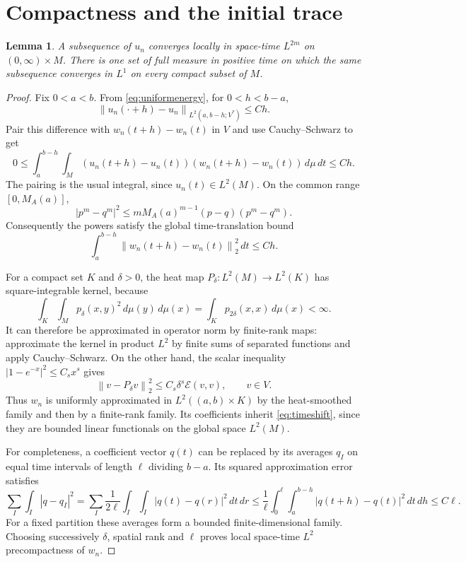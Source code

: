 \documentclass[11pt]{article}
\newtheorem{lemma}[theorem]{Lemma}
\theoremstyle{remark}
\newcommand{\dd}{\,d\mu}
\newcommand{\E}{\mathcal E}
\newcommand{\norm}[1]{\left\lVert#1\right\rVert}
\begin{document}
\section{Compactness and the initial trace}

\begin{lemma}\label{lem:compactness}
A subsequence of $u_n$ converges locally in space-time $L^{2m}$ on
$(0,\infty)\times M$. There is one set of full measure in positive time
on which the same subsequence converges in $L^1$ on every compact subset
of $M$.
\end{lemma}

\begin{proof}
Fix $0<a<b$. From \eqref{eq:uniformenergy}, for $0<h<b-a$,
\[
 \norm{u_n(\cdot+h)-u_n}_{L^2(a,b-h;V^*)}\le Ch.
\]
Pair this difference with $w_n(t+h)-w_n(t)$ in $V$ and use
Cauchy--Schwarz to get
\begin{equation}\label{eq:pairedshift}
 0\le \int_a^{b-h}\!\int_M
 (u_n(t+h)-u_n(t))(w_n(t+h)-w_n(t))\dd\,dt\le Ch.
\end{equation}
The pairing is the usual integral, since $u_n(t)\in L^2(M)$.
On the common range $[0,M_A(a)]$,
\[
 |p^m-q^m|^2\le mM_A(a)^{m-1}(p-q)(p^m-q^m).
\]
Consequently the powers satisfy the global time-translation bound
\begin{equation}\label{eq:timeshift}
 \int_a^{b-h}\norm{w_n(t+h)-w_n(t)}_2^2\,dt\le Ch.
\end{equation}

For a compact set $K$ and $\delta>0$, the heat map
$P_\delta:L^2(M)\to L^2(K)$ has square-integrable kernel, because
\[
 \int_K\int_Mp_\delta(x,y)^2\dd(y)\dd(x)
       =\int_Kp_{2\delta}(x,x)\dd(x)<\infty.
\]
It can therefore be approximated in operator norm by finite-rank maps:
approximate the kernel in product $L^2$ by finite sums of separated
functions and apply Cauchy--Schwarz. On the other hand, the scalar
inequality $|1-e^{-x}|^2\le C_sx^s$ gives
\begin{equation}\label{eq:heatsmooth}
 \norm{v-P_\delta v}_2^2\le C_s\delta^s\E(v,v),\qquad v\in V.
\end{equation}
Thus $w_n$ is uniformly approximated in $L^2((a,b)\times K)$ by the
heat-smoothed family and then by a finite-rank family. Its coefficients
inherit \eqref{eq:timeshift}, since they are bounded linear functionals
on the global space $L^2(M)$.

For completeness, a coefficient vector $q(t)$ can be replaced by its
averages $q_I$ on equal time intervals of length $\ell$ dividing $b-a$.
Its squared approximation error satisfies
\[
 \sum_I\int_I|q-q_I|^2
 =\sum_I\frac1{2\ell}\int_I\int_I|q(t)-q(r)|^2\,dt\,dr
 \le\frac1\ell\int_0^\ell\int_a^{b-h}|q(t+h)-q(t)|^2\,dt\,dh
 \le C\ell.
\]
For a fixed partition these averages form a bounded finite-dimensional
family. Choosing successively $\delta$, spatial rank and $\ell$ proves
local space-time $L^2$ precompactness of $w_n$.


\end{proof}
\end{document}
